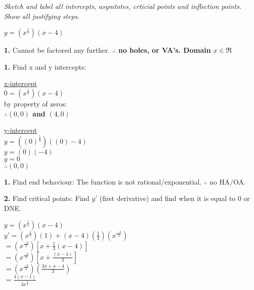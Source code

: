 \documentclass[12pt,fleqn]{book} %
\begin{document}
\noindent \emph{Sketch and label all intercepts, asymtotes, crticial points and inflection points. Show all justifying steps}.

\vspace*{2mm}

{\large $y=(x^\frac{1}{3})(x-4)$}

\vspace*{3mm}

\noindent \textbf{1.} Cannot be factored any further. \textbf{$\therefore$ no holes, or VA's. Domain $x \in \Re$} \\

\vspace*{-4mm}

\noindent \textbf{1.} Find x and y intercepts:

\vspace*{-2mm}

\begin{multicols}{2}
    \begin{center}
        \underline{x-intercept} \\
        $0=(x^\frac{1}{3})(x-4)$\\
        by property of zeros: \\
        \textbf{$\therefore (0, 0)$ and $(4, 0)$}

        \columnbreak

        \underline{y-intercept} \\
        $y=((0)^\frac{1}{3})((0)-4)$ \\
        $y=(0)(-4)$ \\
        $y=0$ \\
        \textbf{$\therefore (0, 0)$}
        \columnbreak
    \end{center}
\end{multicols}

\noindent \textbf{1.} Find end behaviour: The function is not rational/exponential. $\therefore$ no HA/OA.

\vspace*{2mm}

\noindent \textbf{2.} Find critical points: Find $y'$ (first derivative) and find when it is equal to 0 or DNE.

\vspace*{-2mm}

\begin{center}
    $y = (x^\frac{1}{3})(x-4)$ \\
    \vspace*{2mm}
    $y' = (x^\frac{1}{3})(1) + (x-4)(\frac{1}{3})(x^\frac{-2}{3})$ \\
    \vspace*{1mm}
    $= (x^\frac{-2}{3})[x+\frac{1}{3}(x-4)]$ \\
    \vspace*{1mm}
    $= (x^\frac{-2}{3})[x+\frac{(x-4)}{3}]$ \\
    \vspace*{1mm}
    $= (x^\frac{-2}{3})(\frac{3x+x-4}{3})$ \\
    \vspace*{1mm}
    {\large $= \frac{4(x-1)}{3x^\frac{2}{3}}$}
    \vspace*{1mm}
\end{center}
\end{document}

